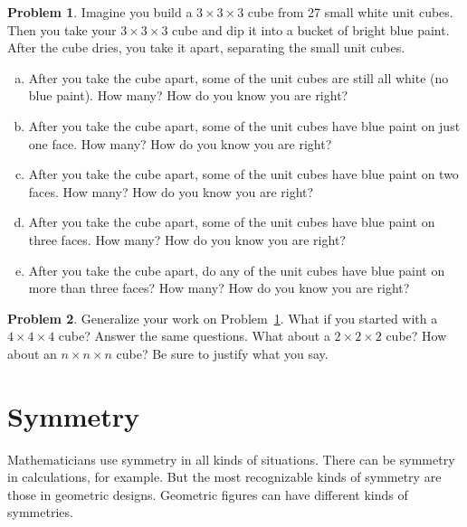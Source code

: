 \documentclass[12pt, reqno]{amsart}
\theoremstyle{remark}
\theoremstyle{definition}
\newtheorem{problem}{Problem}
\numberwithin{equation}{section}  %
\begin{document}
\begin{problem}\label{prob:paintedcube}
Imagine you build a $3\times3\times3$ cube from 27 small  white unit cubes.    Then you take your $3\times3\times 3$ cube and dip it into a bucket of bright blue paint.  After the cube dries, you take it apart, separating  the small unit cubes.  

\medskip

\begin{enumerate}[(a)]
\item
After you take the cube apart, some of the unit cubes are still all white (no blue paint).  How many?  How do you know you are right?\\

\item
After you take the cube apart, some of the unit cubes have blue paint on just one face.  How many?  How do you know you are right?\\

\item
After you take the cube apart, some of the unit cubes have blue paint on two faces.  How many?  How do you know you are right?\\

\item
After you take the cube apart, some of the unit cubes have blue paint on three faces.  How many?  How do you know you are right?\\

\item
After you take the cube apart, do any of the unit cubes have blue paint on more than three faces?  How many?  How do you know you are right?\\

\end{enumerate}

\end{problem}

\bigskip

\begin{problem}
Generalize your work on Problem~\ref{prob:paintedcube}.  What if you started with a $4\times4\times4$ cube?  Answer the same questions.  What about a $2\times2\times2$ cube?  How about an $n\times n\times n$ cube?  Be sure to justify what you say.
\end{problem}





\newpage

\section{Symmetry}
Mathematicians use symmetry in all kinds of situations.  There can be symmetry in calculations, for example. But  the most recognizable kinds of symmetry are those in geometric designs.  Geometric figures can have different kinds of symmetries.
\end{document}
